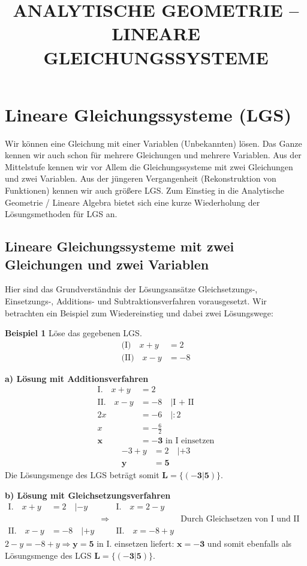 \documentclass{article}
\title{ANALYTISCHE GEOMETRIE – LINEARE GLEICHUNGSSYSTEME}
\author{}
\date{}
\begin{document}
\maketitle

\section{Lineare Gleichungssysteme (LGS)}

Wir können eine Gleichung mit einer Variablen (Unbekannten) lösen. Das Ganze kennen wir auch schon für mehrere Gleichungen und mehrere Variablen. Aus der Mittelstufe kennen wir vor Allem die Gleichungssysteme mit zwei Gleichungen und zwei Variablen. Aus der jüngeren Vergangenheit (Rekonstruktion von Funktionen) kennen wir auch größere LGS. Zum Einstieg in die Analytische Geometrie / Lineare Algebra bietet sich eine kurze Wiederholung der Lösungsmethoden für LGS an.

\subsection{Lineare Gleichungssysteme mit zwei Gleichungen und zwei Variablen}

Hier sind das Grundverständnis der Lösungsansätze Gleichsetzungs-, Einsetzungs-, Additions- und Subtraktionsverfahren vorausgesetzt. Wir betrachten ein Beispiel zum Wiedereinstieg und dabei zwei Lösungswege:

\textbf{Beispiel 1} Löse das gegebenen LGS.
\begin{align*}
\text{(I)} \quad x + y &= 2\\
\text{(II)} \quad x - y &= -8
\end{align*}

\textbf{a) Lösung mit Additionsverfahren}
\begin{align*}
\text{I.} \quad x + y &= 2\\
\text{II.} \quad x - y &= -8 \quad |\text{I + II}\\
2x &= -6 \quad |: 2\\
x &= -\frac{6}{2}\\
\mathbf{x} &= \mathbf{-3} \text{ in I einsetzen}
\end{align*}
\begin{align*}
-3 + y &= 2 \quad |+3\\
\mathbf{y} &= \mathbf{5}
\end{align*}
Die Lösungsmenge des LGS beträgt somit $\mathbf{L = \{(-3|5)\}}$.

\textbf{b) Lösung mit Gleichsetzungsverfahren}
\begin{align*}
\text{I.} \quad x + y &= 2 \quad |- y && \text{I.} \quad x = 2 - y\\
&&\Rightarrow && \text{Durch Gleichsetzen von I und II folgt}\\
\text{II.} \quad x - y &= -8 \quad |+ y && \text{II.} \quad x = -8 + y
\end{align*}
$2 - y = -8 + y \Rightarrow \mathbf{y = 5}$ in I. einsetzen liefert: $\mathbf{x = -3}$ und somit ebenfalls als Lösungsmenge des LGS $\mathbf{L = \{(-3|5)\}}$.
\end{document}
